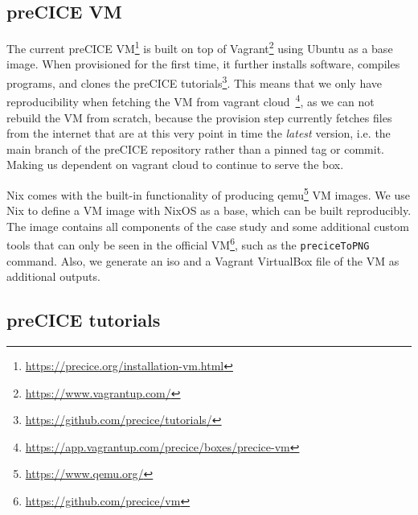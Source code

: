 \documentclass{eceasst}
\begin{document}
\subsection{preCICE VM}

The current preCICE VM\footnote{\url{https://precice.org/installation-vm.html}} is built on top of Vagrant\footnote{\url{https://www.vagrantup.com/}} using Ubuntu as a base image.
When provisioned for the first time, it further installs software, compiles programs, and clones the preCICE tutorials\footnote{\url{https://github.com/precice/tutorials/}}.
This means that we only have reproducibility when fetching the VM from vagrant cloud~\footnote{\url{https://app.vagrantup.com/precice/boxes/precice-vm}}, as we can not rebuild the VM from scratch, because the provision step currently fetches files from the internet that are at this very point in time the \textit{latest} version, i.e. the main branch of the preCICE repository rather than a pinned tag or commit.
Making us dependent on vagrant cloud to continue to serve the box.

Nix comes with the built-in functionality of producing qemu\footnote{\url{https://www.qemu.org/}} VM images.
We use Nix to define a VM image with NixOS as a base, which can be built reproducibly.
The image contains all components of the case study and some additional custom tools that can only be seen in the official VM\footnote{\url{https://github.com/precice/vm}}, such as the \texttt{preciceToPNG} command.
Also, we generate an iso and a Vagrant VirtualBox file of the VM as additional outputs.

\subsection{preCICE tutorials}
\end{document}
